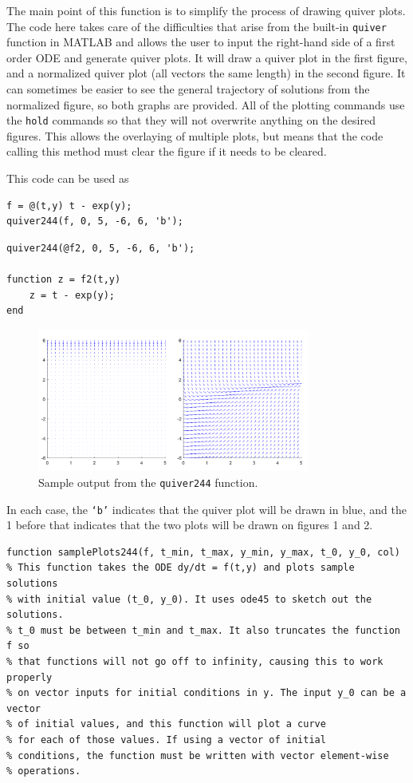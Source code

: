 \documentclass{ximera}
\begin{document}
The main point of this function is to simplify the process of drawing quiver plots. The code here takes care of the difficulties that arise from the built-in \texttt{quiver} function in MATLAB and allows the user to input the right-hand side of a first order ODE and generate quiver plots. It will draw a quiver plot in the first figure, and a normalized quiver plot (all vectors the same length) in the second figure. It can sometimes be easier to see the general trajectory of solutions from the normalized figure, so both graphs are provided. All of the plotting commands use the \texttt{hold} commands so that they will not overwrite anything on the desired figures. This allows the overlaying of multiple plots, but means that the code calling this method must clear the figure if it needs to be cleared. 

This code can be used as
\begin{verbatim}
f = @(t,y) t - exp(y);
quiver244(f, 0, 5, -6, 6, 'b');
\end{verbatim}

\begin{verbatim}
quiver244(@f2, 0, 5, -6, 6, 'b');

function z = f2(t,y)
    z = t - exp(y);
end
\end{verbatim}

\begin{figure}[h!]
    \centering
    \includegraphics[width=0.8\textwidth]{figures/MatlabDemo_quiv.png}
    \caption{Sample output from the \texttt{quiver244} function.}
    \label{fig:MatlabDemo_Quiv}
\end{figure}

In each case, the \texttt{`b'} indicates that the quiver plot will be drawn in blue, and the 1 before that indicates that the two plots will be drawn on figures 1 and 2. 

\begin{verbatim}
function samplePlots244(f, t_min, t_max, y_min, y_max, t_0, y_0, col)
% This function takes the ODE dy/dt = f(t,y) and plots sample solutions
% with initial value (t_0, y_0). It uses ode45 to sketch out the solutions.
% t_0 must be between t_min and t_max. It also truncates the function f so
% that functions will not go off to infinity, causing this to work properly
% on vector inputs for initial conditions in y. The input y_0 can be a vector 
% of initial values, and this function will plot a curve
% for each of those values. If using a vector of initial
% conditions, the function must be written with vector element-wise
% operations. 
\end{verbatim}
\end{document}
